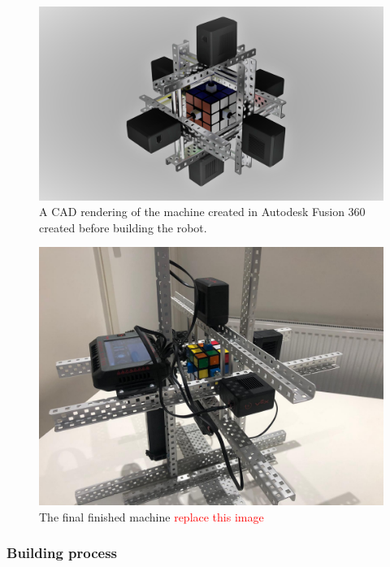 \documentclass[8pt]{article}
\begin{document}
\begin{minipage}{0.45\textwidth}
\begin{figure}[H]

\includegraphics[scale=0.05]{main cad.jpg}
\caption{A CAD rendering of the machine created in Autodesk Fusion 360 created 
before building the robot.}
\end{figure}
\end{minipage}%
\hfill
\begin{minipage}{0.45\textwidth}
\begin{figure}[H]

\includegraphics[scale=0.05]{final machine.jpg}
\caption{The final finished machine \textcolor{red}{replace this image}}
\end{figure}    
\end{minipage}

\subsubsection{Building process} 
\end{document}
